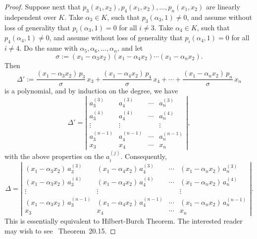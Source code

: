 \documentclass[12pt]{article}
\theoremstyle{definition}
\theoremstyle{remark}
\begin{document}
\begin{proof}
Suppose next that $p_3(x_1,x_2),p_4(x_1,x_2),\ldots,p_n(x_1,x_2)$
are linearly independent over $K$. Take $\alpha_3 \in K$, such that
$p_3(\alpha _3,1) \ne 0$, and assume without loss of generality that
$p_i(\alpha _3,1) = 0$ for all $i \ne 3$. Take $\alpha_4 \in K$, such that
$p_4(\alpha _4,1) \ne 0$, and assume without loss of generality that
$p_i(\alpha _4,1) = 0$ for all $i \ne 4$. Do the same with
$\alpha_5, \alpha_6, \ldots, \alpha_n$, and let
$$
\sigma := (x_1 - \alpha_3 x_2) (x_1 - \alpha_4 x_2) \cdots (x_1 - \alpha_n x_2). 
$$
Then
$$
\Delta' := \frac{(x_1 - \alpha_3 x_2) \,p_3}{\sigma} \,x_3 + 
\frac{(x_1 - \alpha_4 x_2) \,p_4}{\sigma} \,x_4 + \cdots + 
\frac{(x_1 - \alpha_n x_2) \,p_n}{\sigma} \,x_n
$$
is a polynomial, and by induction on the degree, we have
$$
\Delta' = \left| \begin{array}{cccc}
a^{(3)}_3 & a^{(3)}_4 & \cdots & a^{(3)}_n \\
a^{(4)}_3 & a^{(4)}_4 & \cdots & a^{(4)}_n \\
\vdots & \vdots & & \vdots \\
a^{(n-1)}_3 & a^{(n-1)}_4 & \cdots & a^{(n-1)}_n \\
\hline
x_3 & x_4 & \cdots & x_n
\end{array} \right|,
$$
with the above properties on the $a^{(j)}_i$. Consequently,
$$
\Delta = \left| \begin{array}{cccc}
(x_1-\alpha_3 x_2) \,a^{(3)}_3 & (x_1-\alpha_4 x_2) \,a^{(3)}_4 & \cdots & (x_1-\alpha_n x_2) \,a^{(3)}_n \\
(x_1-\alpha_3 x_2) \,a^{(4)}_3 & (x_1-\alpha_4 x_2) \,a^{(4)}_4 & \cdots & (x_1-\alpha_n x_2) \,a^{(4)}_n \\
\vdots & \vdots & & \vdots \\
(x_1-\alpha_3 x_2) \,a^{(n-1)}_3 & (x_1-\alpha_4 x_2) \,a^{(n-1)}_4 & \cdots & (x_1-\alpha_n x_2) \,a^{(n-1)}_n \\
\hline
x_3 & x_4 & \cdots & x_n
\end{array} \right|.
$$
This is essentially equivalent to Hilbert-Burch Theorem. The interested reader may wish to see \cite{eisenbud}~Theorem~20.15.
\end{proof}
\end{document}
